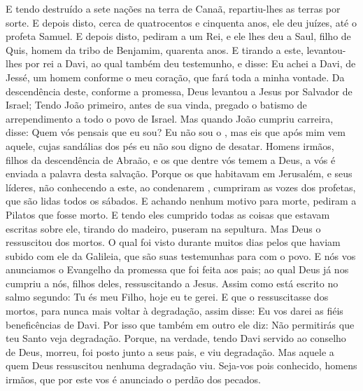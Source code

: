 {  E tendo destruído a sete nações na terra de Canaã, repartiu-lhes as terras por sorte.
  E depois disto, cerca de quatrocentos e cinquenta anos, ele
{} deu juízes, até o profeta Samuel.
  E depois disto, pediram a um Rei, e ele lhes deu a Saul, filho de Quis, homem da tribo de Benjamim,
{} quarenta anos.
  E tirando a este, levantou-lhes por rei a Davi, ao qual também deu testemunho, e disse: Eu achei a Davi,
{} de Jessé, um homem conforme o meu coração, que fará toda a minha vontade.
  Da descendência
 deste, conforme a promessa, Deus levantou a Jesus por Salvador de Israel;
  Tendo João primeiro, antes de sua vinda, pregado o batismo de arrependimento a todo o povo de Israel.
  Mas quando João cumpriu
{} carreira, disse: Quem vós pensais que eu sou? Eu não sou o
{}, mas eis que após mim vem aquele, cujas sandálias dos pés eu não sou digno de desatar.
  Homens irmãos, filhos da descendência de Abraão, e os que dentre vós temem a Deus, a vós é enviada a palavra desta salvação.
  Porque os que habitavam em Jerusalém, e seus líderes, não conhecendo a este, ao condenarem
{}, cumpriram as vozes dos profetas, que são lidas todos os sábados.
  E
{} achando nenhum motivo para morte, pediram a Pilatos que fosse morto.
  E tendo eles cumprido todas as coisas que estavam escritas sobre ele, tirando
{} do madeiro, puseram
{} na sepultura.
  Mas Deus o ressuscitou dos mortos.
  O qual foi visto durante muitos dias pelos que haviam subido com ele da Galileia, que são suas testemunhas para com o povo.
  E nós vos anunciamos o Evangelho da promessa que foi feita aos pais; ao qual Deus já nos cumpriu a nós, filhos deles, ressuscitando a Jesus.
  Assim como está escrito no salmo segundo: Tu és meu Filho, hoje eu te gerei.
  E
{} que o ressuscitasse dos mortos, para nunca mais voltar à degradação,
 assim disse: Eu vos darei as fiéis beneficências de Davi.
  Por isso que também em outro
{} ele diz: Não permitirás que teu Santo veja degradação.
  Porque, na verdade, tendo Davi servido ao conselho de Deus, morreu,
 foi posto junto a seus pais, e viu degradação.
  Mas aquele a quem Deus ressuscitou nenhuma degradação viu.
  Seja-vos pois conhecido, homens irmãos, que por este vos é anunciado o perdão dos pecados.
}
